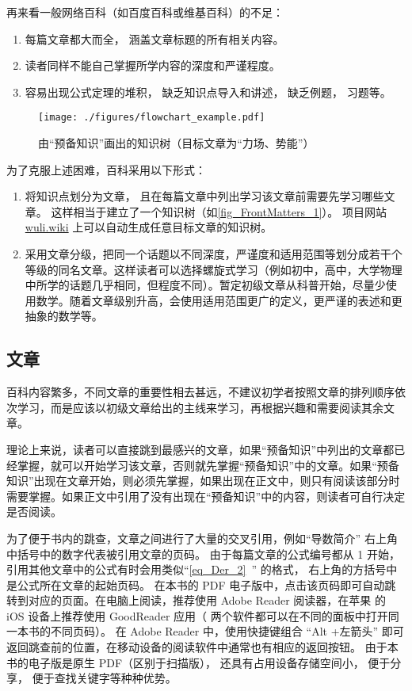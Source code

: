 再来看一般网络百科（如百度百科或维基百科）的不足：
\begin{enumerate}
\item 每篇文章都大而全， 涵盖文章标题的所有相关内容。
\item 读者同样不能自己掌握所学内容的深度和严谨程度。
\item 容易出现公式定理的堆积， 缺乏知识点导入和讲述， 缺乏例题， 习题等。
\end{enumerate}

\begin{figure}[ht]
\centering
\texttt{[image: ./figures/flowchart\_example.pdf]}
\caption{由“预备知识”画出的知识树（目标文章为“力场、势能”）}\label{fig_FrontMatters_1}
\end{figure}

为了克服上述困难，百科采用以下形式：
\begin{enumerate}
\item 将知识点划分为文章， 且在每篇文章中列出学习该文章前需要先学习哪些文章。 这样相当于建立了一个知识树（如\autoref{fig_FrontMatters_1}）。 项目网站 \href{https://wuli.wiki}{wuli.wiki} 上可以自动生成任意目标文章的知识树。
\item 采用文章分级，把同一个话题以不同深度，严谨度和适用范围等划分成若干个等级的同名文章。这样读者可以选择螺旋式学习（例如初中，高中，大学物理中所学的话题几乎相同，但程度不同）。暂定初级文章从科普开始，尽量少使用数学。随着文章级别升高，会使用适用范围更广的定义，更严谨的表述和更抽象的数学等。
\end{enumerate}

\subsection{文章}
百科内容繁多，不同文章的重要性相去甚远，不建议初学者按照文章的排列顺序依次学习，而是应该以初级文章给出的主线来学习，再根据兴趣和需要阅读其余文章。

理论上来说，读者可以直接跳到最感兴的文章，如果“预备知识”中列出的文章都已经掌握，就可以开始学习该文章，否则就先掌握“预备知识”中的文章。如果“预备知识”出现在文章开始，则必须先掌握，如果出现在正文中，则只有阅读该部分时需要掌握。如果正文中引用了没有出现在“预备知识”中的内容，则读者可自行决定是否阅读。

为了便于书内的跳查，文章之间进行了大量的交叉引用，例如“导数简介” 右上角中括号中的数字代表被引用文章的页码。 由于每篇文章的公式编号都从 1 开始， 引用其他文章中的公式有时会用类似“\autoref{eq_Der_2}~” 的格式， 右上角的方括号中是公式所在文章的起始页码。 在本书的 PDF 电子版中，点击该页码即可自动跳转到对应的页面。在电脑上阅读，推荐使用 Adobe Reader 阅读器，在苹果\textsuperscript{\textregistered} 的 iOS 设备上推荐使用 GoodReader 应用（ 两个软件都可以在不同的面板中打开同一本书的不同页码）。 在 Adobe Reader 中，使用快捷键组合 “Alt +左箭头” 即可返回跳查前的位置，在移动设备的阅读软件中通常也有相应的返回按钮。 由于本书的电子版是原生 PDF（区别于扫描版）， 还具有占用设备存储空间小， 便于分享， 便于查找关键字等种种优势。

